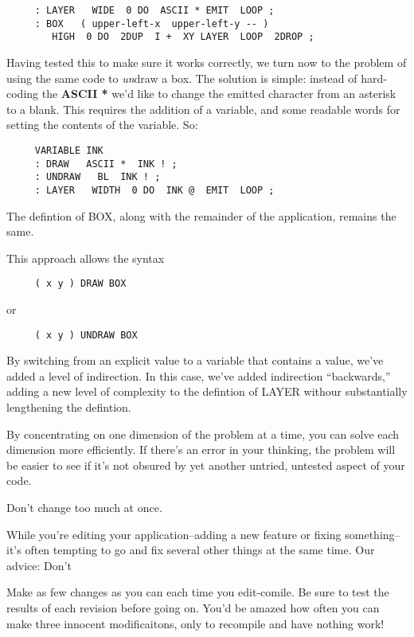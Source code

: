 \begin{verbatim}
     : LAYER   WIDE  0 DO  ASCII * EMIT  LOOP ;
     : BOX   ( upper-left-x  upper-left-y -- )
        HIGH  0 DO  2DUP  I +  XY LAYER  LOOP  2DROP ;
\end{verbatim}
Having tested this to make sure it works correctly, we turn now to the problem of using the same code to \emph{un}draw a box. The solution is simple: instead of hard-coding the \textbf{ASCII *} we'd like to change the emitted character from an asterisk to a blank. This requires the addition of a variable, and some readable words for setting the contents of the variable. So:

\begin{verbatim}
     VARIABLE INK
     : DRAW   ASCII *  INK ! ;
     : UNDRAW   BL  INK ! ;
     : LAYER   WIDTH  0 DO  INK @  EMIT  LOOP ;
\end{verbatim}
The defintion of BOX, along with the remainder of the application, remains the same.

This approach allows the syntax

\begin{verbatim}
     ( x y ) DRAW BOX
\end{verbatim}
or

\begin{verbatim}
     ( x y ) UNDRAW BOX
\end{verbatim}
By switching from an explicit value to a variable that contains a value, we've added a level of indirection. In this case, we've added indirection ``backwards,'' adding a new level of complexity to the defintion of LAYER withour substantially lengthening the defintion.

By concentrating on one dimension of the problem at a time, you can solve each dimension more efficiently. If there's an error in your thinking, the problem will be easier to see if it's not obsured by yet another untried, untested aspect of your code.

\begin{tip}
Don't change too much at once.
\end{tip}
While you're editing your application--adding a new feature or fixing something--it's often tempting to go and fix several other things at the same time. Our advice: Don't

Make as few changes as you can each time you edit-comile. Be sure to test the results of each revision before going on. You'd be amazed how often you can make three innocent modificaitons, only to recompile and have nothing work!

